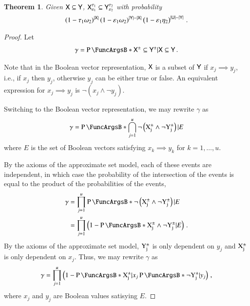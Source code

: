 \documentclass[10pt,final,hidelinks]{article}
\numberwithin{equation}{section}
\providecommand{\Given}{\vert}
\DeclarePairedDelimiter\Card{\lvert}{\rvert}
\newcommand{\tprate}{\tau}
\newcommand{\fprate}{\varepsilon}
\newcommand{\fnrate}{\omega}
\newcommand{\tnrate}{\eta}
\newcommand{\envnumstyle}{chapter}
\renewcommand{\envnumstyle}{chapter}
\renewcommand{\envnumstyle}{section}
\theoremstyle{plain}
\newtheorem{theorem}{Theorem}[\envnumstyle]
\begin{document}
\begin{theorem}
Given $\Set{X} \subseteq \Set{Y}$, $\ASet{X}[\fprate_1][\tprate_1] \subseteq \ASet{Y}[\fprate_2][\tprate_2]$ with probability
\begin{equation}
	\left(1 - \tprate_1\fnrate_2\right)^{\Card{\Set{X}}}
	\left(1 - \fprate_1\fnrate_2\right)^{\Card{\Set{Y}} - \Card{\Set{X}}}
	\left(1 - \fprate_1\tnrate_2\right)^{\Card{\Set{U}} - \Card{\Set{Y}}}\,.
\end{equation}
\end{theorem}
\begin{proof}
	Let
	\begin{equation}
	\gamma = \Prob{\ASet{X} \subseteq \ASet{Y} \Given \Set{X} \subseteq 
		\Set{Y}}\,.
	\end{equation}
	
	Note that in the Boolean vector representation, $\Set{X}$ is a subset of 
	$\Set{Y}$ if $x_j \implies y_j$, i.e., if $x_j$ then $y_j$, otherwise $y_j$ can 
	be either true or false. An equivalent expression for $x_j \implies y_j$ is 
	$\neg (x_j \land \neg y_j)$.
	
	Switching to the Boolean vector representation, we may rewrite $\gamma$ as
	\begin{equation}
	\gamma = \Prob{\bigcap_{j=1}^{u} \neg \left(\AVecComp{X}[j] \land \neg 
		\AVecComp{Y}[j]\right) \Given E}
	\end{equation}
	where $E$ is the set of Boolean vectors satisfying $x_k \implies y_k$ for     
	$k=1,\ldots,u$.
	
	By the axioms of the approximate set model, each of these events are 
	independent, in which case the probability of the intersection of the events is 
	equal to the product of the probabilities of the events,
	\begin{align}
	\gamma
	&= \prod_{j=1}^{u} \Prob{\neg\left(\AVecComp{X}[j] 
		\land \neg \AVecComp{Y}[j]\right) \Given E}\\
	&= \prod_{j=1}^{u} \left(1 - \Prob{\AVecComp{X}[j] 
		\land \neg \AVecComp{Y}[j] \Given E}\right)\,.
	\end{align}
	By the axioms of the approximate set model, $\AVecComp{Y}[j]$ is only dependent 
	on $y_j$ and $\AVecComp{X}[j]$ is only dependent on $x_j$. Thus, we may rewrite 
	$\gamma$ as
	\begin{equation}
	\gamma = \prod_{j=1}^{u}\left(
	1 - \Prob{\AVecComp{X}[j] \Given x_j}
	\Prob{\neg \AVecComp{Y}[j] \Given y_j}\right)\,,
	\end{equation}
	where $x_j$ and $y_j$ are Boolean values satisying $E$.
	

\end{proof}
\end{document}
